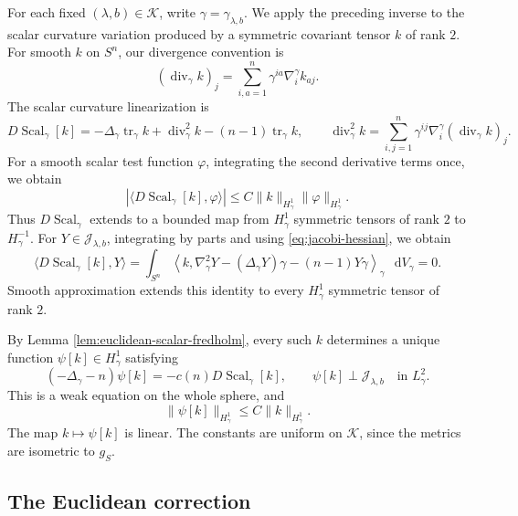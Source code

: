 \documentclass[11pt]{article}
\numberwithin{equation}{section}
\theoremstyle{remark}
\newcommand{\Sph}{S}
\newcommand{\dd}{\mathop{}\!\mathrm{d}}
\DeclareMathOperator{\tr}{tr}
\DeclareMathOperator{\diver}{div}
\begin{document}
For each fixed \((\lambda,b)\in\mathcal K\), write
\(\gamma=\gamma_{\lambda,b}\). We apply the preceding inverse to the
scalar curvature variation produced by a symmetric covariant
tensor \(k\) of rank \(2\). For smooth \(k\) on \(\Sph^n\), our divergence
convention is
\[
 (\diver_\gamma k)_j
 =\sum_{i,a=1}^n\gamma^{ia}\nabla^\gamma_i k_{aj}.
\]
The scalar curvature linearization is
\[
 D\!\operatorname{Scal}_\gamma[k]
 =-\Delta_\gamma\tr_\gamma k+\diver_\gamma^2k
 -(n-1)\tr_\gamma k,\qquad
 \diver_\gamma^2k
 =\sum_{i,j=1}^n\gamma^{ij}
   \nabla^\gamma_i(\diver_\gamma k)_j.
\]
{For a smooth scalar test function \(\varphi\), integrating the
second derivative terms once, we obtain}
\[
 |\langle D\!\operatorname{Scal}_\gamma[k],\varphi\rangle|
 \le C\|k\|_{H^1_\gamma}\|\varphi\|_{H^1_\gamma}.
\]
Thus \(D\!\operatorname{Scal}_\gamma\) extends to a bounded map from \(H^1_\gamma\)
symmetric tensors of rank \(2\) to \(H^{-1}_\gamma\).
{For \(Y\in\mathcal J_{\lambda,b}\), integrating by parts and
using \eqref{eq:jacobi-hessian}, we obtain}
 {
\begin{equation}\label{eq:spherical-curvature-compatibility}
 \langle D\!\operatorname{Scal}_\gamma[k],Y\rangle
 =\int_{\Sph^n}\!
 \left\langle k,\nabla_\gamma^2Y
       -(\Delta_\gamma Y)\gamma-(n-1)Y\gamma\right\rangle_\gamma
 \,\dd V_\gamma
 =0.
\end{equation}
}
Smooth approximation extends this identity to every \(H^1_\gamma\)
symmetric tensor of rank \(2\).

{By Lemma  \ref{lem:euclidean-scalar-fredholm}, every such
\(k\) determines a unique function \(\psi[k]\in H^1_\gamma\) satisfying}
\begin{equation}\label{eq:spherical-scalar-equation}
 (-\Delta_\gamma-n)\psi[k]=-c(n)D\!\operatorname{Scal}_\gamma[k],
 \qquad \psi[k]\perp\mathcal J_{\lambda,b}
 \quad\text{in }L^2_\gamma.
\end{equation}
This is a weak equation on the whole sphere, and
\begin{equation}\label{eq:spherical-scalar-estimate}
 \|\psi[k]\|_{H^1_\gamma}\le C\|k\|_{H^1_\gamma}.
\end{equation}
The map \(k\mapsto\psi[k]\) is linear. The constants are uniform on
\(\mathcal K\), since the metrics are isometric to \(g_{S}\).

\subsection{The Euclidean correction}
\end{document}
